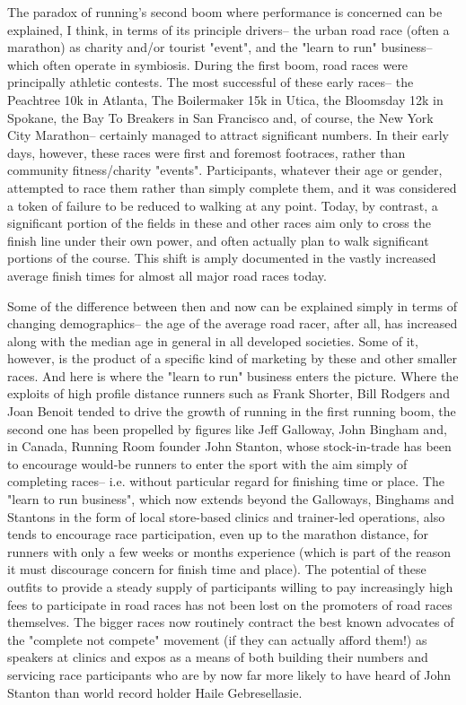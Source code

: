The paradox of running's second boom where performance is concerned can be explained, I think, in terms of its principle drivers-- the urban road race (often a marathon) as charity and/or tourist "event", and the "learn to run" business-- which often operate in symbiosis. During the first boom, road races were principally athletic contests. The most successful of these early races-- the Peachtree 10k in Atlanta, The Boilermaker 15k in Utica, the Bloomsday 12k in Spokane, the Bay To Breakers in San Francisco and, of course, the New York City Marathon-- certainly managed to attract significant numbers. In their early days, however, these races were first and foremost footraces, rather than community fitness/charity "events". Participants, whatever their age or gender, attempted to race them rather than simply complete them, and it was considered a token of failure to be reduced to walking at any point. Today, by contrast, a significant portion of the fields in these and other races aim only to cross the finish line under their own power, and often actually plan to walk significant portions of the course. This shift is amply documented in the vastly increased average finish times for almost all major road races today.

Some of the difference between then and now can be explained simply in terms of changing demographics-- the age of the average road racer, after all, has increased along with the median age in general in all developed societies. Some of it, however, is the product of a specific kind of marketing by these and other smaller races. And here is where the "learn to run" business enters the picture. Where the exploits of high profile distance runners such as Frank Shorter, Bill Rodgers and Joan Benoit tended to drive the growth of running in the first running boom, the second one has been propelled by figures like Jeff Galloway, John Bingham and, in Canada, Running Room founder John Stanton, whose stock-in-trade has been to encourage would-be runners to enter the sport with the aim simply of completing races-- i.e. without particular regard for finishing time or place. The "learn to run business", which now extends beyond the Galloways, Binghams and Stantons in the form of local store-based clinics and trainer-led operations, also tends to encourage race participation, even up to the marathon distance, for runners with only a few weeks or months experience (which is part of the reason it must discourage concern for finish time and place). The potential of these outfits to provide a steady supply of participants willing to pay increasingly high fees to participate in road races has not been lost on the promoters of road races themselves. The bigger races now routinely contract the best known advocates of the "complete not compete" movement (if they can actually afford them!) as speakers at clinics and expos as a means of both building their numbers and servicing race participants who are by now far more likely to have heard of John Stanton than world record holder Haile Gebresellasie.

